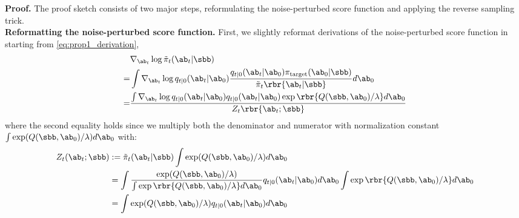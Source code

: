 \textbf{Proof.} 
The proof sketch consists of two major steps, reformulating the noise-perturbed score function and applying the reverse sampling trick.
    \\\textbf{Reformatting the noise-perturbed score function.} First, we slightly reformat derivations of the noise-perturbed score function in  starting from \eqref{eq:prop1_derivation},
    \begin{equation}
        \begin{aligned}
            & \nabla_{\ab_t}\log\tilde\pi_t(\ab_t|\sbb)\\
            = &\int \nabla_{\ab_t}\log q_{t|0}(\ab_t|\ab_0)\frac{q_{t|0}(\ab_t|\ab_0)\pi_{\rm target}(\ab_0|\sbb)}{\tilde\pi_t\rbr{\ab_t|\sbb}}d\ab_0\\
            = & \frac{\int \nabla_{\ab_t}\log q_{t|0}(\ab_t|\ab_0) q_{t|0}(\ab_t|\ab_0)\exp\rbr{Q(\sbb,\ab_0)/\lambda} d\ab_0}{Z_t\rbr{\ab_t;\sbb}}\\
        \end{aligned}\label{eq:noise_perturbed_score_apdx}
    \end{equation}
where the second equality holds since we multiply both the denominator and numerator with normalization constant $\int \exp(Q(\sbb,\ab_0)/\lambda)d\ab_0$ with:
\begin{align}
    Z_t(\ab_t; \sbb) & := \tilde{\pi}_t(\ab_t | \sbb) \int \exp(Q(\sbb,\ab_0)/\lambda)d\ab_0 \\
    &= \int\frac{\exp(Q(\sbb, \ab_0)/\lambda)}{\int\exp\rbr{Q(\sbb,\ab_0)/\lambda} d\ab_0}q_{t|0}(\ab_t|\ab_0)d\ab_0\int\exp\rbr{Q(\sbb,\ab_0)/\lambda} d\ab_0\\
        &= \int\exp(Q(\sbb, \ab_0)/\lambda)q_{t|0}(\ab_t|\ab_0)d\ab_0
\end{align}

